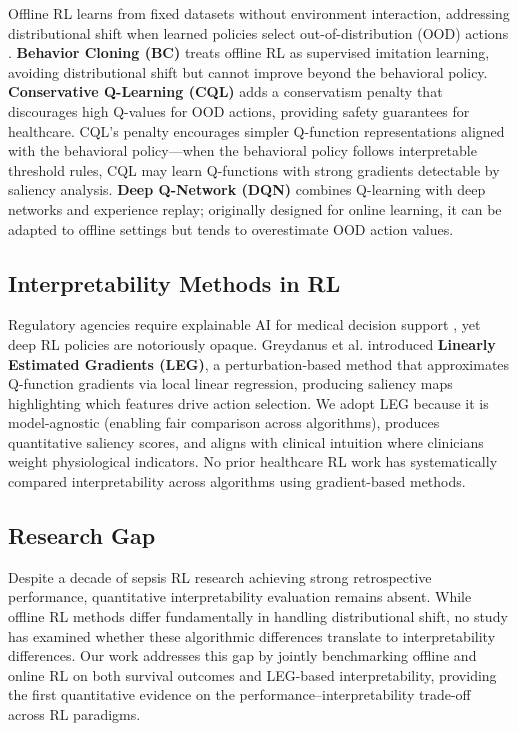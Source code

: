 Offline RL learns from fixed datasets without environment interaction, addressing distributional shift when learned policies select out-of-distribution (OOD) actions \citep{levine2020offline}. \textbf{Behavior Cloning (BC)} \citep{pomerleau1991bc} treats offline RL as supervised imitation learning, avoiding distributional shift but cannot improve beyond the behavioral policy. \textbf{Conservative Q-Learning (CQL)} \citep{kumar2020cql} adds a conservatism penalty that discourages high Q-values for OOD actions, providing safety guarantees for healthcare. CQL's penalty encourages simpler Q-function representations aligned with the behavioral policy—when the behavioral policy follows interpretable threshold rules, CQL may learn Q-functions with strong gradients detectable by saliency analysis. \textbf{Deep Q-Network (DQN)} \citep{mnih2015dqn} combines Q-learning with deep networks and experience replay; originally designed for online learning, it can be adapted to offline settings but tends to overestimate OOD action values.


\subsection{Interpretability Methods in RL}\label{sec:related:interp}

Regulatory agencies require explainable AI for medical decision support \citep{holzinger2017xai_healthcare}, yet deep RL policies are notoriously opaque. Greydanus et al. \citeyearpar{greydanus2018leg} introduced \textbf{Linearly Estimated Gradients (LEG)}, a perturbation-based method that approximates Q-function gradients via local linear regression, producing saliency maps highlighting which features drive action selection. We adopt LEG because it is model-agnostic (enabling fair comparison across algorithms), produces quantitative saliency scores, and aligns with clinical intuition where clinicians weight physiological indicators. No prior healthcare RL work has systematically compared interpretability across algorithms using gradient-based methods.


\subsection{Research Gap}\label{sec:related:gap}

Despite a decade of sepsis RL research achieving strong retrospective performance, quantitative interpretability evaluation remains absent. While offline RL methods differ fundamentally in handling distributional shift, no study has examined whether these algorithmic differences translate to interpretability differences. Our work addresses this gap by jointly benchmarking offline and online RL on both survival outcomes and LEG-based interpretability, providing the first quantitative evidence on the performance--interpretability trade-off across RL paradigms.

